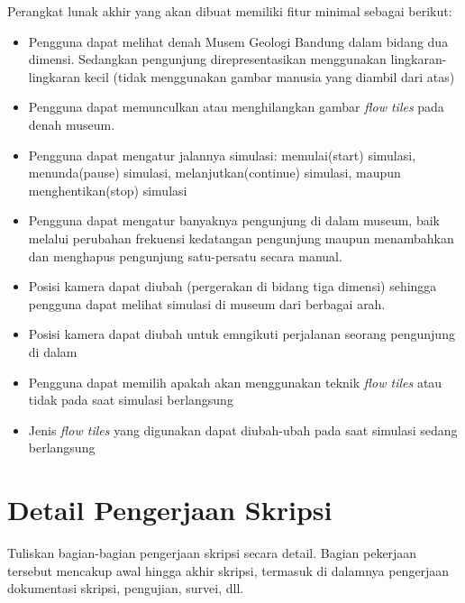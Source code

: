 \documentclass[a4paper,twoside]{article}
\begin{document}
Perangkat lunak akhir yang akan dibuat memiliki fitur minimal sebagai berikut:
\begin{itemize}
	\item Pengguna dapat melihat denah Musem Geologi Bandung dalam bidang dua dimensi. Sedangkan pengunjung direpresentasikan menggunakan lingkaran-lingkaran kecil (tidak menggunakan gambar manusia yang diambil dari atas)
	\item Pengguna dapat memunculkan atau menghilangkan gambar {\it flow tiles} pada denah museum. 
	\item Pengguna dapat mengatur jalannya simulasi: memulai(start) simulasi, menunda(pause) simulasi, melanjutkan(continue) simulasi, maupun menghentikan(stop) simulasi
	\item Pengguna dapat mengatur banyaknya pengunjung di dalam museum, baik melalui perubahan frekuensi kedatangan pengunjung maupun menambahkan dan menghapus pengunjung satu-persatu secara manual.
	\item Posisi kamera dapat diubah (pergerakan di bidang tiga dimensi) sehingga pengguna dapat melihat simulasi di museum dari berbagai arah. 
	\item Posisi kamera dapat diubah untuk emngikuti perjalanan seorang pengunjung di dalam 
	\item Pengguna dapat memilih apakah akan menggunakan teknik {\it flow tiles} atau tidak pada saat simulasi berlangsung
	\item Jenis {\it flow tiles} yang digunakan dapat diubah-ubah pada saat simulasi sedang berlangsung
		
\end{itemize}

\section{Detail Pengerjaan Skripsi}
Tuliskan bagian-bagian pengerjaan skripsi secara detail. Bagian pekerjaan tersebut mencakup awal hingga akhir skripsi, termasuk di dalamnya pengerjaan dokumentasi skripsi, pengujian, survei, dll.
\end{document}
